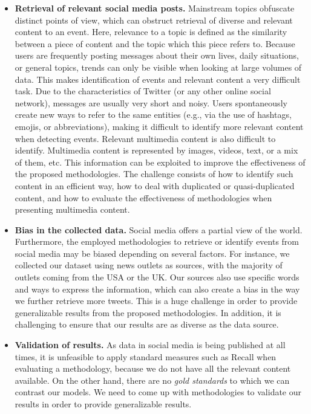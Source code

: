 \begin{itemize}
    \item {\bf Retrieval of relevant social media posts.} 
    Mainstream topics obfuscate distinct points of view, which can
    obstruct retrieval of diverse and relevant content to an event. 
    Here, relevance to a topic is defined as the similarity between a piece of
    content and the topic which this piece refers to.
    Because users are frequently posting messages about their own lives, daily
    situations, or general topics, trends can only be visible when looking at large
    volumes of data. 
    This makes identification of events and relevant content a very difficult task.
    Due to the characteristics of Twitter (or any other online social network),
    messages are usually very short and noisy.
    Users spontaneously create new ways to refer to the same entities
    (e.g., via the use of hashtags, emojis, or abbreviations), making it
    difficult to identify more relevant content when detecting events.
    Relevant multimedia content is also difficult to identify. 
    Multimedia content is represented by images, videos, text, or a mix of them,
    etc. 
    This information can be exploited to improve the effectiveness of
    the proposed methodologies. 
    The challenge consists of how to identify such content in an efficient way,
    how to deal with duplicated or quasi-duplicated content, and how to evaluate
    the effectiveness of methodologies when presenting multimedia content. 

    \item {\bf Bias in the collected data.}
    Social media offers a partial view of the world. 
    Furthermore, the employed methodologies to retrieve or identify events from
    social media may be biased depending on several factors. 
    For instance, we collected our dataset using news outlets as sources, with
    the majority of outlets coming from the USA or the UK. 
    Our sources also use specific words and ways to express the information,
    which can also create a bias in the way we further retrieve more tweets.
    This is a huge challenge in order to provide generalizable results from the
    proposed methodologies. 
    In addition, it is challenging to ensure that our results are as diverse as
    the data source. 

    \item {\bf Validation of results.} 
    As data in social media is being published at all times, it is unfeasible to
    apply standard measures such as Recall when evaluating a methodology,
    because we do not have all the relevant content available.
    On the other hand, there are no {\em gold standards} to which we can
    contrast our models. 
    We need to come up with methodologies to validate our results in order to
    provide generalizable results.

    
\end{itemize}


